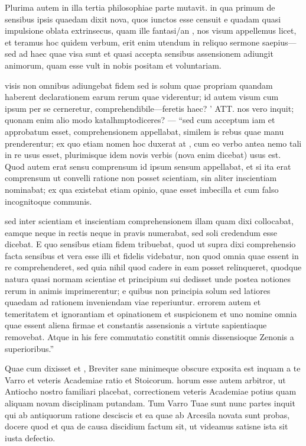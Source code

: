  Plurima autem in illa tertia philosophiae parte mutavit. in qua primum de sensibus ipsis quaedam dixit nova, quos iunctos esse censuit e quadam quasi impulsione oblata extrinsecus, quam ille fantasi/an , nos visum appellemus licet, et teramus hoc quidem verbum, erit enim utendum in reliquo sermone saepius— sed ad haec quae visa sunt et quasi accepta sensibus assensionem adiungit animorum, quam esse vult in nobis positam et voluntariam.

 visis non omnibus adiungebat fidem sed is solum quae propriam quandam haberent declarationem earum rerum quae viderentur; id autem visum cum ipsum per se cerneretur, comprehendibile—feretis haec? ' ATT. nos vero inquit; quonam enim alio modo katalhmpto\n diceres? — ``sed cum acceptum iam et approbatum esset, comprehensionem appellabat, similem is rebus quae manu prenderentur; ex quo etiam nomen hoc duxerat at , cum eo verbo antea nemo tali in re usus esset, plurimisque idem novis verbis (nova enim dicebat) usus est. Quod autem erat sensu comprensum id ipsum sensum appellabat, et si ita erat comprensum ut convelli ratione non posset scientiam, sin aliter inscientiam nominabat; ex qua existebat etiam opinio, quae esset imbecilla et cum falso incognitoque communis.

 sed inter scientiam et inscientiam comprehensionem illam quam dixi collocabat, eamque neque in rectis neque in pravis numerabat, sed soli credendum esse dicebat. E quo sensibus etiam fidem tribuebat, quod ut supra dixi comprehensio facta sensibus et vera esse illi et fidelis videbatur, non quod omnia quae essent in re comprehenderet, sed quia nihil quod cadere in eam posset relinqueret, quodque natura quasi normam scientiae et principium sui dedisset unde postea notiones rerum in animis imprimerentur; e quibus non principia solum sed latiores quaedam ad rationem inveniendam viae reperiuntur. errorem autem et temeritatem et ignorantiam et opinationem et suspicionem et uno nomine omnia quae essent aliena firmae et constantis assensionis a virtute sapientiaque removebat. Atque in his fere commutatio constitit omnis dissensioque Zenonis a superioribus.''

 Quae cum dixisset et , Breviter sane minimeque obscure exposita est inquam a te Varro et veteris Academiae ratio et Stoicorum. horum esse autem arbitror, ut Antiocho nostro familiari placebat, correctionem veteris Academiae potius quam aliquam novam disciplinam putandam. Tum Varro Tuae sunt nunc partes inquit qui ab antiquorum ratione desciscis et ea quae ab Arcesila novata sunt probas, docere quod et qua de causa discidium factum sit, ut videamus satisne ista sit iusta defectio.


